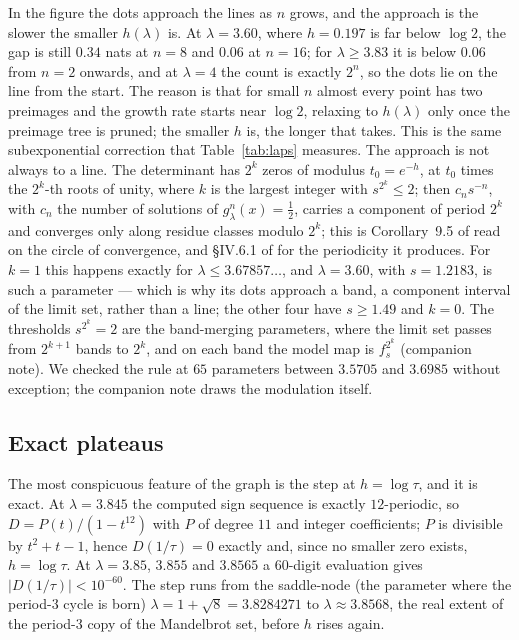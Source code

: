 \documentclass[11pt]{article}
\theoremstyle{plain}
\theoremstyle{definition}
\begin{document}
In the figure the dots approach the lines as $n$ grows, and the approach is the slower
the smaller $h(\lambda)$ is.  At $\lambda=3.60$, where $h=0.197$ is far below $\log2$, the
gap is still $0.34$ nats at $n=8$ and $0.06$ at $n=16$; for $\lambda\ge3.83$ it is below
$0.06$ from $n=2$ onwards, and at $\lambda=4$ the count is exactly $2^n$, so the dots lie on
the line from the start.  The reason is that for small $n$ almost every point has two
preimages and the growth rate starts near $\log2$, relaxing to $h(\lambda)$ only once the
preimage tree is pruned; the smaller $h$ is, the longer that takes.  This is the same
subexponential correction that Table~\ref{tab:laps} measures.  The approach is not always to
a line.  The determinant has $2^k$ zeros of modulus $t_0=e^{-h}$, at $t_0$ times the
$2^k$-th roots of unity, where $k$ is the largest integer with $s^{2^k}\le2$; then
$c_ns^{-n}$, with $c_n$ the number of solutions of $g_\lambda^n(x)=\tfrac12$, carries a
component of period $2^k$ and converges only along residue classes
modulo $2^k$; this is Corollary~9.5 of \cite{MT} read on the circle of convergence, and
\S IV.6.1 of \cite{FS} for the periodicity it produces.  For $k=1$ this happens exactly for $\lambda\le3.67857\ldots$, and
$\lambda=3.60$, with $s=1.2183$, is such a parameter --- which is why its dots approach a
band, a component interval of the limit set, rather than a line; the other four have $s\ge1.49$ and $k=0$.  The thresholds
$s^{2^k}=2$ are the band-merging parameters, where the limit set passes from $2^{k+1}$ bands
to $2^k$, and on each band the model map is $f_s^{2^k}$ (companion note).  We
checked the rule at $65$ parameters between $3.5705$ and $3.6985$ without exception; the
companion note draws the modulation itself.

\subsection{Exact plateaus}

The most conspicuous feature of the graph is the step at $h=\log\tau$, and it is exact.
At $\lambda=3.845$ the computed sign sequence is exactly
$12$-periodic, so $D=P(t)/(1-t^{12})$ with $P$ of degree $11$ and integer coefficients;
$P$ is divisible by $t^2+t-1$, hence $D(1/\tau)=0$ exactly and, since no smaller zero
exists, $h=\log\tau$.  At $\lambda=3.85$, $3.855$ and $3.8565$ a $60$-digit evaluation
gives $|D(1/\tau)|<10^{-60}$.  The step runs from the saddle-node (the parameter where the
period-$3$ cycle is born) $\lambda=1+\sqrt8=3.8284271$ to $\lambda\approx3.8568$, the real extent of the period-$3$
copy of the Mandelbrot set, before $h$ rises again.
\end{document}
